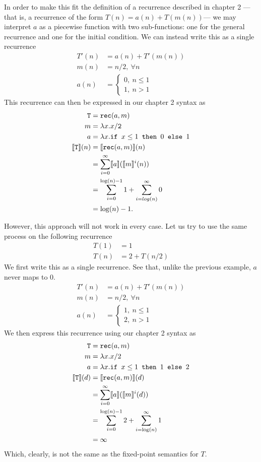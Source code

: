  In order to make this fit the definition of a recurrence described in 
chapter 2 --- that is, a recurrence of the form $T(n) = a(n) + T(m(n))$--- we may interpret $a$ as a 
piecewise function with two sub-functions: one for the general recurrence and one for the initial condition.
We can instead write this as a single recurrence
\begin{align*}
T'(n) &= a(n) + T'(m(n)) \\
m(n) &= n/2, \ \forall n \\ 
a(n) &=
\begin{cases} 
0, \ n \leq 1 \\
1, \ n > 1
\end{cases}
\end{align*} 
This recurrence can then be expressed in our chapter 2 syntax as 
\begin{align*}
\texttt{T} &= \texttt{rec}(a,m) \\
m &= \lambda x.x/\texttt{2} \\
a &= \lambda x.\texttt{if } x\leq 1 \texttt{ then } 0 \texttt{ else } 1 \\
\llbracket \texttt{T} \rrbracket(n) &= \llbracket \texttt{rec}(a,m) \rrbracket(n) \\
&= \sum_{i=0}^{\infty}\llbracket a \rrbracket(\llbracket m\rrbracket^i(n)) \\
&= \sum_{i=0}^{\log(n)-1} 1 + \sum_{i=log(n)}^{\infty} 0 \\
&= \log(n) - 1.
\end{align*}

However, this approach will not work in every case. Let us try to use the same process on the following recurrence
\begin{align*}
T(1) &= 1 \\
T(n) &= 2 + T(n/2) 
\end{align*}
We first write this as a single recurrence. See that, unlike the previous example, $a$ never maps to $0$.
\begin{align*}
T'(n) &= a(n) + T'(m(n)) \\
m(n) &= n/2, \ \forall n \\ 
a(n) &= 
\begin{cases}
1, \ n \leq 1 \\
2, \ n > 1
\end{cases}
\end{align*}
We then express this recurrence using our chapter 2 syntax as
\begin{align*}
\texttt{T} &= \texttt{rec}(a,m) \\
m &= \lambda x.x/2 \\
a &=\lambda x.\texttt{if } x\leq1 \texttt{ then } 1 \texttt{ else } 2 \\
\llbracket \texttt{T} \rrbracket(d) &= \llbracket \texttt{rec}(a,m) \rrbracket(d) \\
&= \sum_{i=0}^{\infty}\llbracket a \rrbracket(\llbracket m\rrbracket^i(d)) \\
&= \sum_{i=0}^{\log(n)-1} 2 + \sum_{i=\log(n) }^{\infty} 1 \\
&= \infty
\end{align*}
Which, clearly, is not the same as the fixed-point semantics for $T$.

